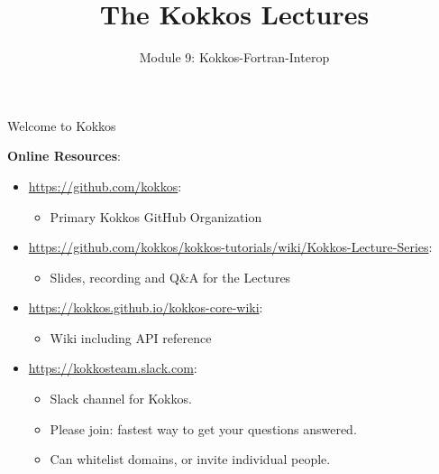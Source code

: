 

\def\sandid{SAND2020-9315 TR}


\title{The Kokkos Lectures}

\author{Module 9: Kokkos-Fortran-Interop}



\shortfalse
\mediumfalse
\fullfalse
\notoverviewtrue

\usepackage{minted}



\begin{frame}
	\titlepage
\end{frame}

\begin{frame}[fragile]{Welcome to Kokkos}

\textbf{Online Resources}:

\begin{itemize}
        \item \url{https://github.com/kokkos}:
                \begin{itemize}
                        \item Primary Kokkos GitHub Organization
                \end{itemize}
        \item \url{https://github.com/kokkos/kokkos-tutorials/wiki/Kokkos-Lecture-Series}:
                \begin{itemize}
        \item{Slides, recording and Q\&A for the Lectures}
                \end{itemize}
        \item \url{https://kokkos.github.io/kokkos-core-wiki}:
                \begin{itemize}
                        \item Wiki including API reference
                \end{itemize}
        \item \url{https://kokkosteam.slack.com}:
                \begin{itemize}
                        \item Slack channel for Kokkos.
                        \item Please join: fastest way to get your questions answered.
                        \item Can whitelist domains, or invite individual people.
                \end{itemize}
\end{itemize}

\end{frame}

